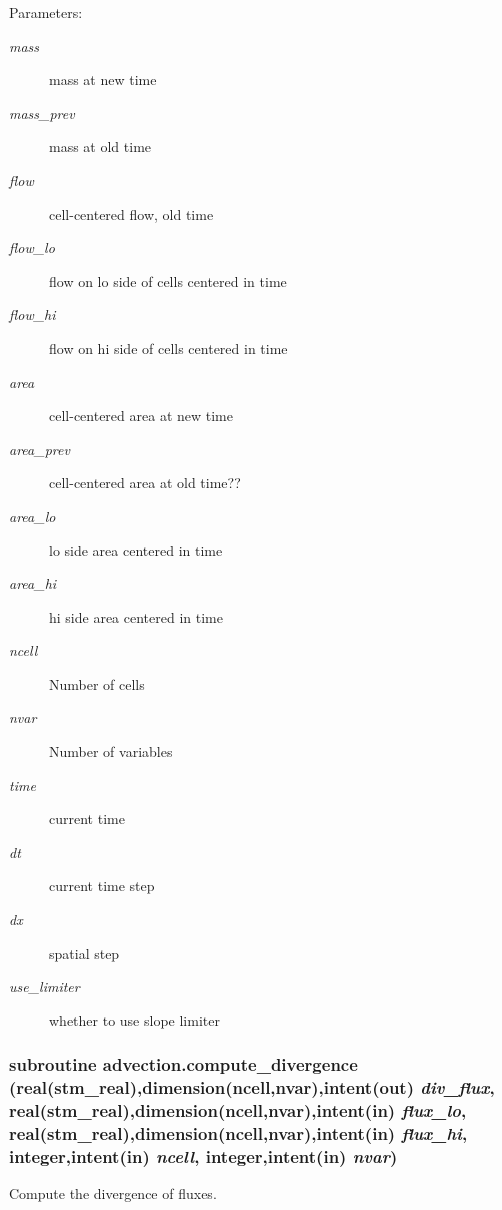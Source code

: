 \begin{Desc}
\item[Parameters:]
\begin{description}
\item[{\em mass}]mass at new time\item[{\em mass\_\-prev}]mass at old time\item[{\em flow}]cell-centered flow, old time\item[{\em flow\_\-lo}]flow on lo side of cells centered in time\item[{\em flow\_\-hi}]flow on hi side of cells centered in time\item[{\em area}]cell-centered area at new time\item[{\em area\_\-prev}]cell-centered area at old time??\item[{\em area\_\-lo}]lo side area centered in time\item[{\em area\_\-hi}]hi side area centered in time\item[{\em ncell}]Number of cells\item[{\em nvar}]Number of variables\item[{\em time}]current time\item[{\em dt}]current time step\item[{\em dx}]spatial step\item[{\em use\_\-limiter}]whether to use slope limiter \end{description}
\end{Desc}
\hypertarget{a00052_aa34a3af6ce02dba4b6a11c1b38f51f0}{
\subsubsection[{compute\_\-divergence}]{\setlength{\rightskip}{0pt plus 5cm}subroutine advection.compute\_\-divergence (real(stm\_\-real),dimension(ncell,nvar),intent(out) {\em div\_\-flux}, \/  real(stm\_\-real),dimension(ncell,nvar),intent(in) {\em flux\_\-lo}, \/  real(stm\_\-real),dimension(ncell,nvar),intent(in) {\em flux\_\-hi}, \/  integer,intent(in) {\em ncell}, \/  integer,intent(in) {\em nvar})}}
\label{a00052_aa34a3af6ce02dba4b6a11c1b38f51f0}


Compute the divergence of fluxes. 

